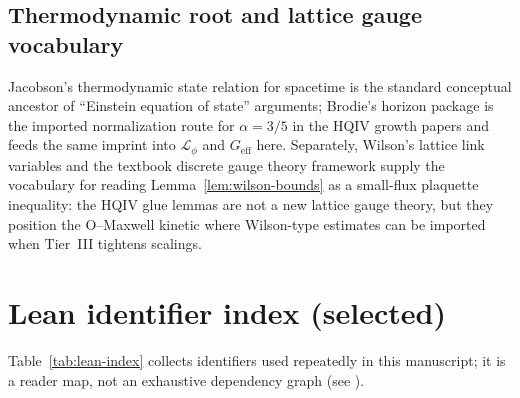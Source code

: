 \documentclass[11pt]{amsart}
\begin{document}
\subsection{Thermodynamic root and lattice gauge vocabulary}

Jacobson's thermodynamic state relation for spacetime \cite{jacobson1995} is the standard conceptual ancestor of ``Einstein equation of state'' arguments; Brodie's horizon package \cite{brodie2026} is the imported normalization route for \(\alpha=3/5\) in the HQIV growth papers and feeds the same imprint into \(\mathcal{L}_\phi\) and \(G_{\mathrm{eff}}\) here. Separately, Wilson's lattice link variables \cite{wilson1974} and the textbook discrete gauge theory framework \cite{creutz1983} supply the vocabulary for reading Lemma~\ref{lem:wilson-bounds} as a small-flux plaquette inequality: the HQIV glue lemmas are not a new lattice gauge theory, but they position the O--Maxwell kinetic where Wilson-type estimates can be imported when Tier~III tightens scalings.

\appendix

\section{Lean identifier index (selected)}
\label{app:lean-index}

Table~\ref{tab:lean-index} collects identifiers used repeatedly in this manuscript; it is a reader map, not an exhaustive dependency graph (see \cite{hqiv-lean}).
\end{document}
